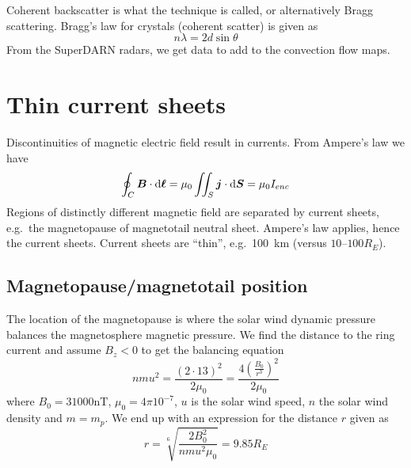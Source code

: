 Coherent backscatter is what the technique is called, or alternatively Bragg scattering. Bragg's law for crystals (coherent scatter) is given as
\begin{equation}\label{eq:L8_bragg_scatter}
    n\lambda=2d\sin\theta
\end{equation}
From the SuperDARN radars, we get data to add to the convection flow maps.

\section{Thin current sheets}
Discontinuities of magnetic electric field result in currents. From Ampere's law we have
\begin{equation*}
    \oint_C\boldsymbol{B}\cdot\textnormal{d}\boldsymbol{\ell}=\mu_0\iint_S\boldsymbol{j}\cdot\textnormal{d}\boldsymbol{S}=\mu_0I_{enc}
\end{equation*}
Regions of distinctly different magnetic field are separated by current sheets, e.g.\ the magnetopause of magnetotail neutral sheet. Ampere's law applies, hence the current sheets. Current sheets are ``thin'', e.g.\ \SI{100}{\kilo\metre} (versus \(10\)--\(100 R_E\)).

\subsection{Magnetopause/magnetotail position}
The location of the magnetopause is where the solar wind dynamic pressure balances the magnetosphere magnetic pressure.
We find the distance to the ring current and assume \(B_z<0\) to get the balancing equation
\begin{equation*}
    nmu^2=\frac{{(2\cdot 13)}^2}{2\mu_0}=\frac{4{\left(\frac{B_0}{r^3}\right)}^2}{2\mu_0}
\end{equation*}
where \(B_0=\num{31000}\si{\nano\tesla}\), \(\mu_0=4\pi 10^{-7}\), \(u\) is the solar wind speed, \(n\) the solar wind density and \(m=m_p\). We end up with an expression for the distance \(r\) given as
\begin{equation*}
    r=\sqrt[6]{\frac{2B_0^2}{nmu^2\mu_0}}=9.85 R_E
\end{equation*}

